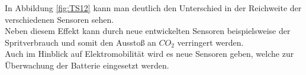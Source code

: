 \begin{flushleft}
	                     In Abbildung \ref{fig:TS12} kann man deutlich den Unterschied in der Reichweite der verschiedenen Sensoren sehen.\\
	                     
	                     Neben diesem Effekt kann durch neue entwickelten Sensoren beispielsweise der Spritverbrauch und somit den Ausstoß an $CO_2$ verringert werden.\\
	                     Auch im Hinblick auf Elektromobilität wird es neue Sensoren geben, welche zur Überwachung der Batterie eingesetzt werden.
\end{flushleft}